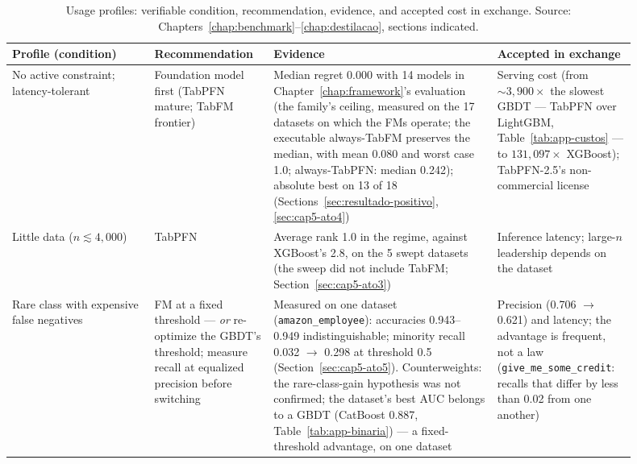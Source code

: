 \begin{table}[p]
\centering
\caption[Usage profiles: condition, recommendation, evidence, and
trade]{Usage profiles: verifiable condition, recommendation,
evidence, and accepted cost in exchange. Source:
Chapters~\ref{chap:benchmark}--\ref{chap:destilacao}, sections
indicated.}
\label{tab:conc-perfis}
\scriptsize
\setlength{\tabcolsep}{5pt}
\renewcommand{\arraystretch}{1.0}
\begin{tabular}{>{\raggedright\arraybackslash}p{0.21\linewidth}>{\raggedright\arraybackslash}p{0.17\linewidth}>{\raggedright\arraybackslash}p{0.33\linewidth}>{\raggedright\arraybackslash}p{0.19\linewidth}}
\toprule
\textbf{Profile (condition)} & \textbf{Recommendation} &
\textbf{Evidence} & \textbf{Accepted in exchange} \\
\midrule
No active constraint; latency-tolerant &
Foundation model first (TabPFN mature; TabFM frontier) &
Median regret 0.000 with 14 models in
Chapter~\ref{chap:framework}'s evaluation (the family's ceiling,
measured on the 17 datasets on which the FMs operate; the executable always-TabFM
preserves the median, with mean 0.080 and worst case 1.0;
always-TabPFN: median 0.242); absolute best on 13 of 18
(Sections~\ref{sec:resultado-positivo}, \ref{sec:cap5-ato4}) &
Serving cost (from ${\sim}3{,}900\times$ the slowest GBDT ---
TabPFN over LightGBM, Table~\ref{tab:app-custos} --- to
$131{,}097\times$ XGBoost); TabPFN-2.5's non-commercial license \\
\addlinespace[2.5pt]
Little data ($n \lesssim 4{,}000$) &
TabPFN &
Average rank 1.0 in the regime, against XGBoost's 2.8, on the 5
swept datasets (the sweep did not include TabFM;
Section~\ref{sec:cap5-ato3}) &
Inference latency; large-$n$ leadership depends on the dataset \\
\addlinespace[2.5pt]
Rare class with expensive false negatives &
FM at a fixed threshold --- \emph{or} re-optimize the GBDT's
threshold; measure recall at equalized precision before switching &
Measured on one dataset (\texttt{amazon\_employee}): accuracies
0.943--0.949
indistinguishable; minority recall 0.032 $\to$ 0.298 at threshold
0.5 (Section~\ref{sec:cap5-ato5}). Counterweights: the
rare-class-gain hypothesis was not confirmed; the dataset's best AUC
belongs to a GBDT (CatBoost 0.887, Table~\ref{tab:app-binaria}) ---
a fixed-threshold advantage, on one dataset &
Precision (0.706 $\to$ 0.621) and latency; the advantage is
frequent, not a law (\texttt{give\_\allowbreak me\_\allowbreak some\_\allowbreak credit}: recalls that
differ by less than 0.02 from one another) \\

\end{tabular}
\end{table}
